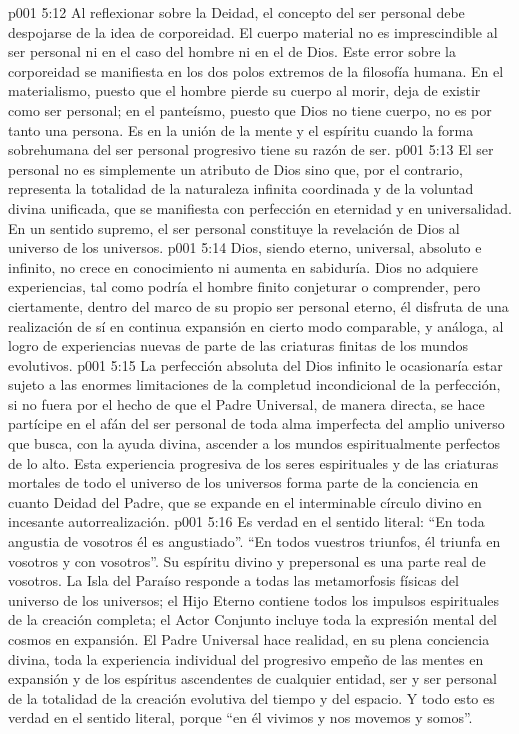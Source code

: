 \vs p001 5:12 Al reflexionar sobre la Deidad, el concepto del ser personal debe despojarse de la idea de corporeidad. El cuerpo material no es imprescindible al ser personal ni en el caso del hombre ni en el de Dios. Este error sobre la corporeidad se manifiesta en los dos polos extremos de la filosofía humana. En el materialismo, puesto que el hombre pierde su cuerpo al morir, deja de existir como ser personal; en el panteísmo, puesto que Dios no tiene cuerpo, no es por tanto una persona. Es en la unión de la mente y el espíritu cuando la forma sobrehumana del ser personal progresivo tiene su razón de ser.
\vs p001 5:13 \pc El ser personal no es simplemente un atributo de Dios sino que, por el contrario, representa la totalidad de la naturaleza infinita coordinada y de la voluntad divina unificada, que se manifiesta con perfección en eternidad y en universalidad. En un sentido supremo, el ser personal constituye la revelación de Dios al universo de los universos.
\vs p001 5:14 \pc Dios, siendo eterno, universal, absoluto e infinito, no crece en conocimiento ni aumenta en sabiduría. Dios no adquiere experiencias, tal como podría el hombre finito conjeturar o comprender, pero ciertamente, dentro del marco de su propio ser personal eterno, él disfruta de una realización de sí en continua expansión en cierto modo comparable, y análoga, al logro de experiencias nuevas de parte de las criaturas finitas de los mundos evolutivos.
\vs p001 5:15 La perfección absoluta del Dios infinito le ocasionaría estar sujeto a las enormes limitaciones de la completud incondicional de la perfección, si no fuera por el hecho de que el Padre Universal, de manera directa, se hace partícipe en el afán del ser personal de toda alma imperfecta del amplio universo que busca, con la ayuda divina, ascender a los mundos espiritualmente perfectos de lo alto. Esta experiencia progresiva de los seres espirituales y de las criaturas mortales de todo el universo de los universos forma parte de la conciencia en cuanto Deidad del Padre, que se expande en el interminable círculo divino en incesante autorrealización.
\vs p001 5:16 Es verdad en el sentido literal: “En toda angustia de vosotros él es angustiado”. “En todos vuestros triunfos, él triunfa en vosotros y con vosotros”. Su espíritu divino y prepersonal es una parte real de vosotros. La Isla del Paraíso responde a todas las metamorfosis físicas del universo de los universos; el Hijo Eterno contiene todos los impulsos espirituales de la creación completa; el Actor Conjunto incluye toda la expresión mental del cosmos en expansión. El Padre Universal hace realidad, en su plena conciencia divina, toda la experiencia individual del progresivo empeño de las mentes en expansión y de los espíritus ascendentes de cualquier entidad, ser y ser personal de la totalidad de la creación evolutiva del tiempo y del espacio. Y todo esto es verdad en el sentido literal, porque “en él vivimos y nos movemos y somos”.
